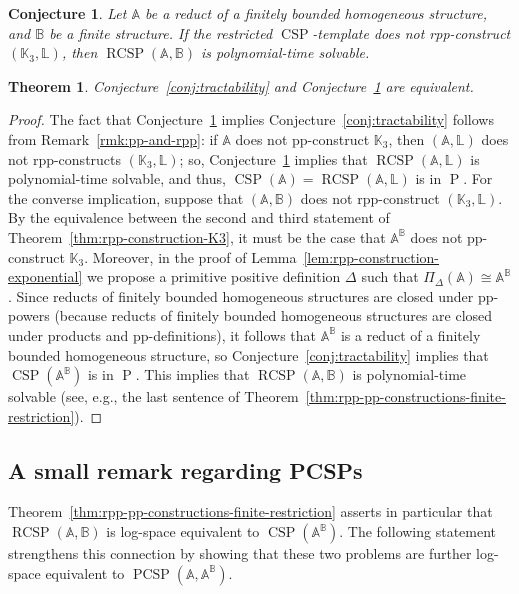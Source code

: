 \documentclass{article}
\newtheorem{theorem}{Theorem}
\newtheorem{conjecture}{Conjecture}
\theoremstyle{definition}
\theoremstyle{remark}
\DeclareMathOperator{\cP}{P}
\DeclareMathOperator{\CSP}{CSP}
\DeclareMathOperator{\PCSP}{PCSP}
\DeclareMathOperator{\RCSP}{RCSP}
\newcommand{\bA}{{\mathbb A}}
\newcommand{\bB}{{\mathbb B}}
\newcommand{\bK}{{\mathbb K}}
\newcommand{\bL}{{\mathbb L}}
\begin{document}
\begin{conjecture}\label{conj:red-FB-homogeneous}
    Let $\bA$ be a reduct of a finitely bounded homogeneous structure, and $\bB$ be a finite
    structure.  If the restricted $\CSP$-template does not rpp-construct $(\bK_3,\bL)$, then
    $\RCSP(\bA,\bB)$ is polynomial-time solvable.
\end{conjecture}

\begin{theorem}
    Conjecture~\ref{conj:tractability} and Conjecture~\ref{conj:red-FB-homogeneous} are equivalent.
\end{theorem}
\begin{proof}
    The fact that Conjecture~\ref{conj:red-FB-homogeneous} implies Conjecture~\ref{conj:tractability}
    follows from Remark~\ref{rmk:pp-and-rpp}: if $\bA$ does not pp-construct $\bK_3$, then $(\bA,\bL)$
    does not rpp-constructs $(\bK_3,\bL)$; so, Conjecture~\ref{conj:red-FB-homogeneous} implies that
    $\RCSP(\bA,\bL)$ is polynomial-time solvable, and thus, $\CSP(\bA) = \RCSP(\bA,\bL)$ is in $\cP$. 
    For the converse implication, suppose that $(\bA,\bB)$ does not rpp-construct $(\bK_3,\bL)$. 
    By the equivalence between the second and third statement of Theorem~\ref{thm:rpp-construction-K3}, 
    it must be the case that $\bA^\bB$ does not pp-construct $\bK_3$. Moreover, in the proof
    of Lemma~\ref{lem:rpp-construction-exponential} we propose a primitive positive definition
    $\Delta$ such that $\Pi_\Delta(\bA) \cong \bA^\bB$. Since reducts of finitely bounded
    homogeneous structures are closed under pp-powers (because reducts of finitely bounded 
    homogeneous structures are closed under products and pp-definitions), it follows
    that $\bA^\bB$ is a reduct of a finitely bounded homogeneous structure, so Conjecture~\ref{conj:tractability}
    implies that $\CSP(\bA^\bB)$ is in $\cP$. This implies that $\RCSP(\bA,\bB)$ is polynomial-time
    solvable (see, e.g., the last sentence of Theorem~\ref{thm:rpp-pp-constructions-finite-restriction}).
\end{proof}


\subsection{A small remark regarding PCSPs}

Theorem~\ref{thm:rpp-pp-constructions-finite-restriction} asserts in particular that
$\RCSP(\bA,\bB)$ is log-space equivalent to $\CSP(\bA^\bB)$. The following statement
strengthens this connection by showing that these two problems are further log-space
equivalent to $\PCSP(\bA,\bA^\bB)$.
\end{document}
